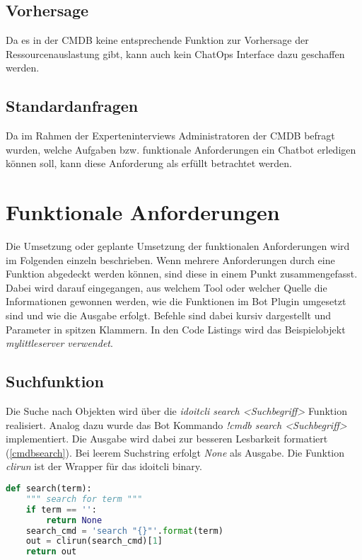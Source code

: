 \subsection{Vorhersage}
 Da es in der \acs{CMDB} keine entsprechende Funktion zur Vorhersage der Ressourcenauslastung gibt, kann auch kein ChatOps Interface dazu geschaffen werden.


\subsection{Standardanfragen}
Da im Rahmen der Experteninterviews Administratoren der \acs{CMDB} befragt wurden, welche Aufgaben bzw. funktionale Anforderungen ein Chatbot erledigen können soll, kann diese Anforderung als erfüllt betrachtet werden. 



\section{Funktionale Anforderungen}
Die Umsetzung oder geplante Umsetzung der funktionalen Anforderungen wird im Folgenden einzeln beschrieben. Wenn mehrere Anforderungen durch eine Funktion abgedeckt werden können, sind diese in einem Punkt zusammengefasst. Dabei wird darauf eingegangen, aus welchem Tool oder welcher Quelle die Informationen gewonnen werden, wie die Funktionen im Bot Plugin umgesetzt sind und wie die Ausgabe erfolgt. Befehle sind dabei kursiv dargestellt und Parameter in spitzen Klammern. In den Code Listings wird das Beispielobjekt \textit{mylittleserver verwendet}.

\subsection{Suchfunktion}
Die Suche nach Objekten wird über die \textit{idoitcli search <Suchbegriff>} Funktion realisiert. Analog dazu wurde das Bot Kommando \textit{!cmdb search <Suchbegriff>} implementiert. Die Ausgabe wird dabei zur besseren Lesbarkeit formatiert (\autoref{cmdbsearch}). Bei leerem Suchstring erfolgt \textit{None} als Ausgabe. Die Funktion \textit{clirun} ist der Wrapper für das idoitcli binary.

\begin{lstlisting}[language=python, label=cmdbsearch, caption=Suchfunktion]
def search(term):
    """ search for term """
    if term == '':
        return None
    search_cmd = 'search "{}"'.format(term)
    out = clirun(search_cmd)[1]
    return out
\end{lstlisting}


